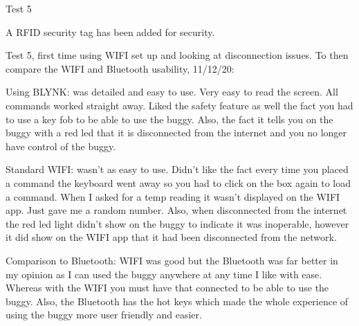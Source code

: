 \documentclass[8pt, a4paper]{article}
\begin{document}
Test 5

A RFID security tag has been added for security. 

Test 5, first time using WIFI set up and looking at disconnection issues. To then compare the WIFI and Bluetooth usability, 11/12/20: 

Using BLYNK: was detailed and easy to use. Very easy to read the screen. All commands worked straight away. Liked the safety feature as well the fact you had to use a key fob to be able to use the buggy. Also, the fact it tells you on the buggy with a red led that it is disconnected from the internet and you no longer have control of the buggy. 

Standard WIFI:  wasn’t as easy to use. Didn’t like the fact every time you placed a command the keyboard went away so you had to click on the box again to load a command. When I asked for a temp reading it wasn’t displayed on the WIFI app. Just gave me a random number. Also, when disconnected from the internet the red led light didn’t show on the buggy to indicate it was inoperable, however it did show on the WIFI app that it had been disconnected from the network.  

Comparison to Bluetooth: WIFI was good but the Bluetooth was far better in my opinion as I can used the buggy anywhere at any time I like with ease. Whereas with the WIFI you must have that connected to be able to use the buggy. Also, the Bluetooth has the hot keys which made the whole experience of using the buggy more user friendly and easier. 
\end{document}
